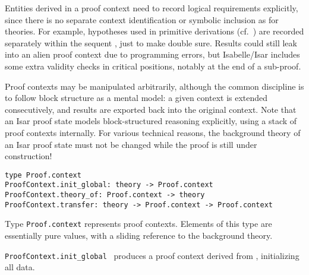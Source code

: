\begin{isabellebody}
\begin{isamarkuptext}
  Entities derived in a proof context need to record logical
  requirements explicitly, since there is no separate context
  identification or symbolic inclusion as for theories.  For example,
  hypotheses used in primitive derivations (cf.\ )
  are recorded separately within the sequent , just to
  make double sure.  Results could still leak into an alien proof
  context due to programming errors, but Isabelle/Isar includes some
  extra validity checks in critical positions, notably at the end of a
  sub-proof.

  Proof contexts may be manipulated arbitrarily, although the common
  discipline is to follow block structure as a mental model: a given
  context is extended consecutively, and results are exported back
  into the original context.  Note that an Isar proof state models
  block-structured reasoning explicitly, using a stack of proof
  contexts internally.  For various technical reasons, the background
  theory of an Isar proof state must not be changed while the proof is
  still under construction!%
\end{isamarkuptext}%
\isamarkuptrue%
%
\isadelimmlref
%
\endisadelimmlref
%
\isatagmlref
%
\begin{isamarkuptext}%
\begin{mldecls}
  \verb|type Proof.context| \\
  \verb|ProofContext.init_global: theory -> Proof.context| \\
  \verb|ProofContext.theory_of: Proof.context -> theory| \\
  \verb|ProofContext.transfer: theory -> Proof.context -> Proof.context| \\
  \end{mldecls}

  \begin{description}

  \item Type \verb|Proof.context| represents proof contexts.
  Elements of this type are essentially pure values, with a sliding
  reference to the background theory.

  \item \verb|ProofContext.init_global|~ produces a proof context
  derived from , initializing all data.


\end{description}
\end{isamarkuptext}
\end{isabellebody}
